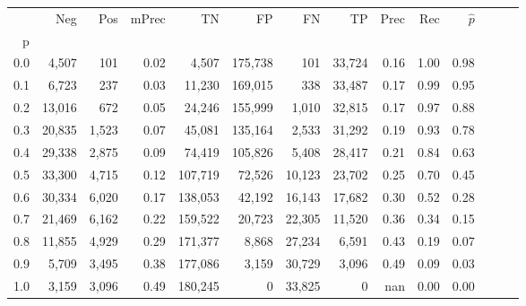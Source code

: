 \begin{tabular}{rrrrrrrrrrrrrr}
\toprule
{} &     Neg &    Pos & mPrec &       TN &       FP &      FN &      TP &  Prec &   Rec & $\hat{p}$ \\
p   &         &        &       &          &          &         &         &       &       &           \\
\midrule
0.0 &   4,507 &    101 &  0.02 &    4,507 &  175,738 &     101 &  33,724 &  0.16 &  1.00 &      0.98 \\
0.1 &   6,723 &    237 &  0.03 &   11,230 &  169,015 &     338 &  33,487 &  0.17 &  0.99 &      0.95 \\
0.2 &  13,016 &    672 &  0.05 &   24,246 &  155,999 &   1,010 &  32,815 &  0.17 &  0.97 &      0.88 \\
0.3 &  20,835 &  1,523 &  0.07 &   45,081 &  135,164 &   2,533 &  31,292 &  0.19 &  0.93 &      0.78 \\
0.4 &  29,338 &  2,875 &  0.09 &   74,419 &  105,826 &   5,408 &  28,417 &  0.21 &  0.84 &      0.63 \\
0.5 &  33,300 &  4,715 &  0.12 &  107,719 &   72,526 &  10,123 &  23,702 &  0.25 &  0.70 &      0.45 \\
0.6 &  30,334 &  6,020 &  0.17 &  138,053 &   42,192 &  16,143 &  17,682 &  0.30 &  0.52 &      0.28 \\
0.7 &  21,469 &  6,162 &  0.22 &  159,522 &   20,723 &  22,305 &  11,520 &  0.36 &  0.34 &      0.15 \\
0.8 &  11,855 &  4,929 &  0.29 &  171,377 &    8,868 &  27,234 &   6,591 &  0.43 &  0.19 &      0.07 \\
0.9 &   5,709 &  3,495 &  0.38 &  177,086 &    3,159 &  30,729 &   3,096 &  0.49 &  0.09 &      0.03 \\
1.0 &   3,159 &  3,096 &  0.49 &  180,245 &        0 &  33,825 &       0 &   nan &  0.00 &      0.00 \\
\bottomrule
\end{tabular}
